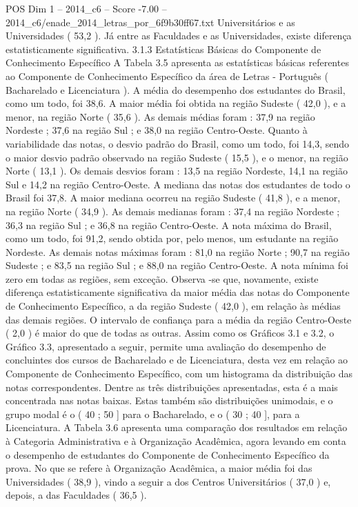 \begin{textsample}{POS Dim 1 – 2014\_c6 – Score -7.00 – 2014\_c6/enade\_2014\_letras\_por\_6f9b30ff67.txt}
Universitários e as Universidades ( 53,2 ).
Já entre as Faculdades e as Universidades, existe diferença estatisticamente significativa. 3.1.3 Estatísticas Básicas do Componente de Conhecimento Específico A Tabela 3.5 apresenta as estatísticas básicas referentes ao Componente de Conhecimento Específico da área de Letras - Português ( Bacharelado e Licenciatura ).
A média do desempenho dos estudantes do Brasil, como um todo, foi 38,6.
A maior média foi obtida na região Sudeste ( 42,0 ), e a menor, na região Norte ( 35,6 ).
As demais médias foram : 37,9 na região Nordeste ; 37,6 na região Sul ; e 38,0 na região Centro-Oeste.
Quanto à variabilidade das notas, o desvio padrão do Brasil, como um todo, foi 14,3, sendo o maior desvio padrão observado na região Sudeste ( 15,5 ), e o menor, na região Norte ( 13,1 ).
Os demais desvios foram : 13,5 na região Nordeste, 14,1 na região Sul e 14,2 na região Centro-Oeste.
A mediana das notas dos estudantes de todo o Brasil foi 37,8.
A maior mediana ocorreu na região Sudeste ( 41,8 ), e a menor, na região Norte ( 34,9 ).
As demais medianas foram : 37,4 na região Nordeste ; 36,3 na região Sul ; e 36,8 na região Centro-Oeste.
A nota máxima do Brasil, como um todo, foi 91,2, sendo obtida por, pelo menos, um estudante na região Nordeste.
As demais notas máximas foram : 81,0 na região Norte ; 90,7 na região Sudeste ; e 83,5 na região Sul ; e 88,0 na região Centro-Oeste.
A nota mínima foi zero em todas as regiões, sem exceção.
Observa -se que, novamente, existe diferença estatisticamente significativa da maior média das notas do Componente de Conhecimento Específico, a da região Sudeste ( 42,0 ), em relação às médias das demais regiões.
O intervalo de confiança para a média da região Centro-Oeste ( 2,0 ) é maior do que de todas as outras.
Assim como os Gráficos 3.1 e 3.2, o Gráfico 3.3, apresentado a seguir, permite uma avaliação do desempenho de concluintes dos cursos de Bacharelado e de Licenciatura, desta vez em relação ao Componente de Conhecimento Específico, com um histograma da distribuição das notas correspondentes.
Dentre as três distribuições apresentadas, esta é a mais concentrada nas notas baixas.
Estas também são distribuições unimodais, e o grupo modal é o ( 40 ; 50 ] para o Bacharelado, e o ( 30 ; 40 ], para a Licenciatura.
A Tabela 3.6 apresenta uma comparação dos resultados em relação à Categoria Administrativa e à Organização Acadêmica, agora levando em conta o desempenho de estudantes do Componente de Conhecimento Específico da prova.
No que se refere à Organização Acadêmica, a maior média foi das Universidades ( 38,9 ), vindo a seguir a dos Centros Universitários ( 37,0 ) e, depois, a das Faculdades ( 36,5 ).

\end{textsample}
